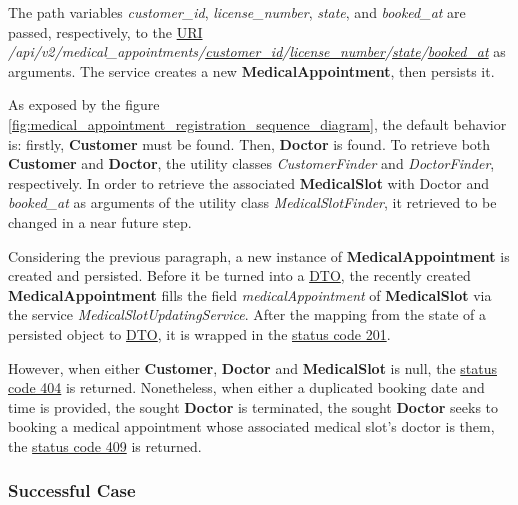 The path variables \textit{customer\_id}, \textit{license\_number}, \textit{state}, and \textit{booked\_at} are passed, respectively, to the \hyperref[appendix:glossary]{URI} \textit{/api/v2/medical\_appointments/\underline{customer\_id}/\underline{license\_number}/\underline{state}/\underline{booked\_at}} as arguments. The service creates a new \textbf{MedicalAppointment}, then persists it.

As exposed by the figure \ref{fig:medical_appointment_registration_sequence_diagram}, the default behavior is: firstly, \textbf{Customer} must be found. Then, \textbf{Doctor} is found. To retrieve both \textbf{Customer} and \textbf{Doctor}, the utility classes \textit{CustomerFinder} and \textit{DoctorFinder}, respectively. In order to retrieve the associated \textbf{MedicalSlot} with Doctor and \textit{booked\_at} as arguments of the utility class \textit{MedicalSlotFinder}, it retrieved to be changed in a near future step.

Considering the previous paragraph, a new instance of \textbf{MedicalAppointment} is created and persisted. Before it be turned into a \hyperref[appendix:glossary]{DTO}, the recently created \textbf{MedicalAppointment} fills the field \textit{medicalAppointment} of \textbf{MedicalSlot} via the service \textit{MedicalSlotUpdatingService}. 
After the mapping from the state of a persisted object to \hyperref[appendix:glossary]{DTO}, it is wrapped in the \hyperref[appendix:http_status_codes_summary_appendix]{status code 201}.

However, when either \textbf{Customer}, \textbf{Doctor} and \textbf{MedicalSlot} is null, the \hyperref[appendix:http_status_codes_summary_appendix]{status code 404} is returned. Nonetheless, when either a duplicated booking date and time is provided, the sought \textbf{Doctor} is terminated, the sought \textbf{Doctor} seeks to booking a medical appointment whose associated medical slot's doctor is them, the  \hyperref[appendix:http_status_codes_summary_appendix]{status code 409} is returned.

\subsubsection{Successful Case}

